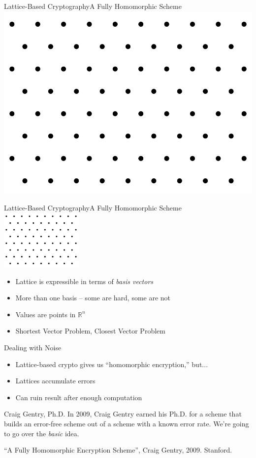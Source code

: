 \documentclass[12pt]{beamer}
\begin{document}
\begin{frame}{Lattice-Based Cryptography}{A Fully Homomorphic Scheme}
	\includegraphics[width=\textwidth]{./pictures/lattice}
\end{frame}

\begin{frame}{Lattice-Based Cryptography}{A Fully Homomorphic Scheme}
	\includegraphics[width=0.3\textwidth]{./pictures/lattice}
	\begin{itemize}
		\item Lattice is expressible in terms of \textit{basis vectors}
		\item More than one basis -- some are hard, some are not
		\item Values are points in $\mathbb{R}^n$
		\item Shortest Vector Problem, Closest Vector Problem
	\end{itemize}
\end{frame}

\begin{frame}{Dealing with Noise}
	\begin{itemize}
		\item Lattice-based crypto gives us ``homomorphic encryption,'' but...
		\item Lattices accumulate errors
		\item Can ruin result after enough computation
	\end{itemize}

	\begin{block}{Craig Gentry, Ph.D.}
		In 2009, Craig Gentry earned his Ph.D. for a scheme that builds an
		error-free scheme out of a scheme with a known error rate. We're going
		to go over the \textit{basic} idea.

		``A Fully Homomorphic Encryption Scheme'', Craig Gentry, 2009. Stanford.
	\end{block}
\end{frame}
\end{document}
